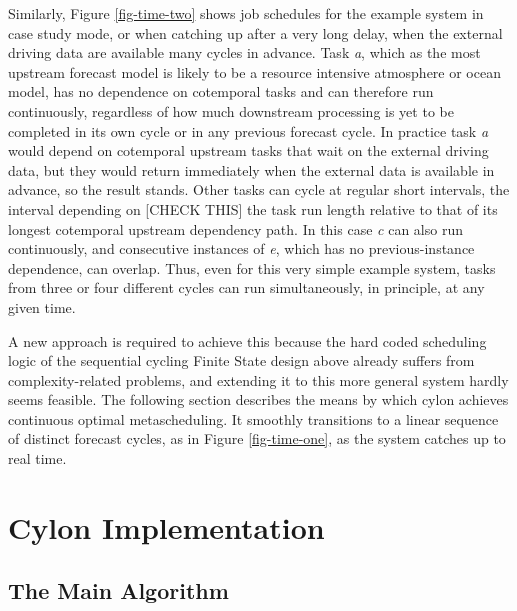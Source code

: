 \documentclass[11pt,a4paper]{article}
\begin{document}
Similarly, Figure \ref{fig-time-two} shows job schedules for the example
system in case study mode, or when catching up after a very long delay,
when the external driving data are available many cycles in advance.
Task {\em a}, which as the most upstream forecast model is likely to be
a resource intensive atmosphere or ocean model, has no dependence on
cotemporal tasks and can therefore run continuously, regardless of how
much downstream processing is yet to be completed in its own cycle or in
any previous forecast cycle. In practice task {\em a} would depend on
cotemporal upstream tasks that wait on the external driving data, but
they would return immediately when the external data is available in
advance, so the result stands. Other tasks can cycle at regular short
intervals, the interval depending on [CHECK THIS] the task run length
relative to that of its longest cotemporal upstream dependency path. In
this case {\em c} can also run continuously, and consecutive instances
of {\em e}, which has no previous-instance dependence, can overlap.
Thus, even for this very simple example system, tasks from three or four
different cycles can run simultaneously, in principle, at any given
time. 

A new approach is required to achieve this because the hard coded
scheduling logic of the sequential cycling Finite State design above
already suffers from complexity-related problems, and extending it to
this more general system hardly seems feasible. The following section
describes the means by which cylon achieves continuous optimal
metascheduling. It smoothly transitions to a linear sequence of distinct
forecast cycles, as in Figure \ref{fig-time-one}, as the system catches
up to real time.  


\section{Cylon Implementation}

\subsection{The Main Algorithm}
\end{document}
